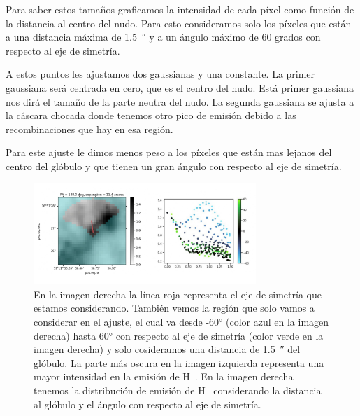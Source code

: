 \documentclass{book}
\begin{document}
Para saber estos tamaños graficamos la intensidad de cada píxel como función de la distancia al centro del nudo. Para esto consideramos solo los píxeles que están a una distancia máxima de \SI{1.5}{\arcsecond} y a un ángulo máximo de 60 grados con respecto al eje de simetría.

A estos puntos les ajustamos dos gaussianas y una constante. La primer gaussiana será centrada en cero, que es el centro del nudo. Está primer gaussiana nos dirá el tamaño de la parte neutra del nudo. La segunda gaussiana se ajusta a la cáscara chocada donde tenemos otro pico de emisión debido a las recombinaciones que hay en esa región.

Para este ajuste le dimos menos peso a los píxeles que están mas lejanos del centro del glóbulo y que tienen un gran ángulo con respecto al eje de simetría.

\begin{figure}[h!]
    \centering
    \includegraphics[width=0.75\textwidth]{images Chapter 3/C3_mask.jpg}
    \caption{En la imagen derecha la línea roja representa el eje de simetría que estamos considerando. También vemos la región que solo vamos a considerar en el ajuste, el cual va desde \ang{-60}  (color azul en la imagen derecha) hasta \ang{60} con respecto al eje de simetría (color verde en la imagen derecha) y solo cosideramos una distancia de  \SI{1.5}{\arcsecond} del glóbulo. La parte más oscura en la imagen izquierda representa una mayor intensidad en la emisión de \unit{H\alpha}. En la imagen derecha tenemos la distribución de emisión de \unit{H\alpha} considerando la distancia al glóbulo y el ángulo con respecto al eje de simetría.}
    \label{ejemplo mascara}
\end{figure}
\end{document}
